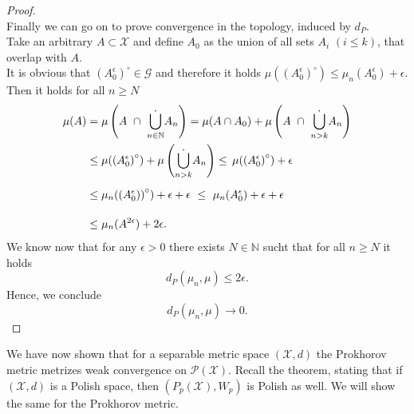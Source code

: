 \documentclass[11pt,a4paper]{article}
\begin{document}
\begin{proof}
\[\]
Finally we can go on to prove convergence in the topology, induced by $d_P$.\\
Take an arbitrary $A\subset\mathcal{X}$ and define $A_0$ as the union of all sets $A_i$ $(i\leq{}k)$, that overlap with $A$.\vspace{1em}\\
It is obvious that $\left(A_0^{\epsilon}\right)^{\circ}\in\mathcal{G}$ and therefore it holds $\mu(\left(A_0^{\epsilon}\right)^{\circ})\leq\mu_n(A_0^{\epsilon})+\epsilon$. Then it holds for all $n\geq{}N$
\begin{align*}
\mu(A) &= \mu\left(A\,\,\cap\,\,\dot{\bigcup\limits_{n\in\mathbb{N}}}A_n\right) = \mu(A\cap{}A_0) + \mu\left(A\,\,\cap\,\,\dot{\bigcup\limits_{n>k}}A_n\right) \\&\leq \mu(\left(A_0^{\epsilon}\right)^{\circ}) + \mu\left(\dot{\bigcup\limits_{n>k}}A_n\right) \leq\,\mu(\left(A_0^{\epsilon}\right)^{\circ})+\epsilon \\[5pt]&\leq\mu_n(\left(A_0^{\epsilon})\right)^{\circ})+\epsilon{}+\epsilon \,\,\leq\,\,\mu_n(A_0^{\epsilon})+\epsilon+\epsilon\\[10pt]&\leq \mu_n(A^{2\epsilon})+2\epsilon.
\vspace{0.3em}\\
\end{align*}
We know now that for any $\epsilon>0$ there exists $N\in\mathbb{N}$ sucht that for all $n\geq{}N$ it holds
\[
d_P(\mu_n,\mu)\leq{}2\epsilon.
\]
Hence, we conclude 
\[
d_P(\mu_n,\mu)\longrightarrow{}0.
\]
\end{proof}
\noindent{}We have now shown that for a separable metric space $(\mathcal{X},d)$ the Prokhorov metric metrizes weak convergence on $\mathcal{P(X)}$. Recall the theorem, stating that if $(\mathcal{X},d)$ is a Polish space, then $\left(P_p(\mathcal{X}),W_p\right)$ is Polish as well. We will show the same for the Prokhorov metric. 
\end{document}
